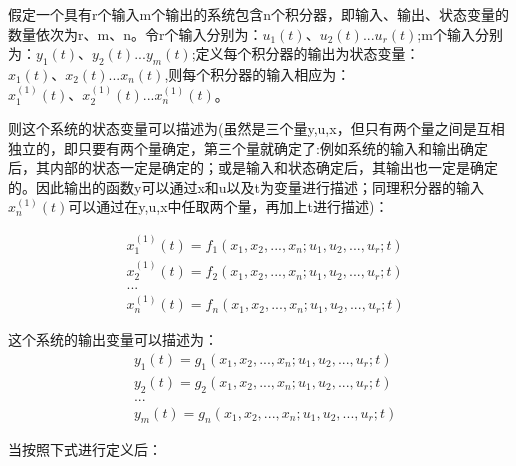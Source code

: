 \documentclass{article}
\numberwithin{equation}{section}
\numberwithin{figure}{section}
\begin{document}
假定一个具有r个输入m个输出的系统包含n个积分器，即输入、输出、状态变量的数量依次为r、m、n。令r个输入分别为：$u_1(t)、u_2(t)...u_r(t)$;m个输入分别为：$y_1(t)、y_2(t)...y_m(t)$;定义每个积分器的输出为状态变量：$x_1(t)、x_2(t)...x_n(t)$,则每个积分器的输入相应为：$x_1^{(1)}(t)、x_2^{(1)}(t)...x_n^{(1)}(t)$。

则这个系统的状态变量可以描述为(虽然是三个量y,u,x，但只有两个量之间是互相独立的，即只要有两个量确定，第三个量就确定了:例如系统的输入和输出确定后，其内部的状态一定是确定的；或是输入和状态确定后，其输出也一定是确定的。因此输出的函数y可以通过x和u以及t为变量进行描述；同理积分器的输入$x_n^{(1)}(t)$可以通过在y,u,x中任取两个量，再加上t进行描述)：

\begin{equation}
    \begin{split}
        &x_1^{(1)}(t)=f_1(x_1,x_2,...,x_n;u_1,u_2,...,u_r;t)\\
        &x_2^{(1)}(t)=f_2(x_1,x_2,...,x_n;u_1,u_2,...,u_r;t)\\
        &...\\
        &x_n^{(1)}(t)=f_n(x_1,x_2,...,x_n;u_1,u_2,...,u_r;t)
    \end{split}
\end{equation}

这个系统的输出变量可以描述为：
\begin{equation}
    \begin{split}
        &y_1(t)=g_1(x_1,x_2,...,x_n;u_1,u_2,...,u_r;t)\\
        &y_2(t)=g_2(x_1,x_2,...,x_n;u_1,u_2,...,u_r;t)\\
        &...\\
        &y_m(t)=g_n(x_1,x_2,...,x_n;u_1,u_2,...,u_r;t)
    \end{split}
\end{equation}

当按照下式进行定义后：
\end{document}
